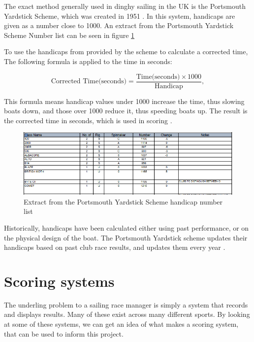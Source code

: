 \documentclass{l4proj}
\begin{document}
The exact method generally used in dinghy sailing in the UK is the Portsmouth Yardstick Scheme, which was created in 1951 \citep{hanicaps}. In this system, handicaps are given as a number close to 1000. An extract from the Portsmouth Yardstick Scheme Number list \citep{RYApy} can be seen in figure \ref{fig:Hanicaps}

To use the handicaps from provided by the scheme to calculate a corrected time, The following formula is applied to the time in seconds:

\begin{equation}
    \text{Corrected Time(seconds)} = \frac{\text{Time(seconds)} \times 1000}{\text{Handicap}},
    \label{eq:1}
\end{equation}  

This formula means handicap values under 1000 increase the time, thus slowing boats down, and those over 1000 reduce it, thus speeding boats up. The result is the corrected time in seconds, which is used in scoring \citep{RYAscore}.

\begin{figure}[H]
    \centering
    \includegraphics[width=1\linewidth]{images/Handicaps.png} 

    \caption{Extract from the Portsmouth Yardstick Scheme handicap number list \citep{RYApy}
    }

    \label{fig:Hanicaps} 
\end{figure}

Historically, handicaps have been calculated either using past performance, or on the physical design of the boat. The Portsmouth Yardstick scheme updates their handicaps based on past club race results, and updates them every year \citep{hanicaps}.

\section{Scoring systems}
The underling problem to a sailing race manager is simply a system that records and displays results. Many of these exist across many different sports. By looking at some of these systems, we can get an idea of what makes a scoring system, that can be used to inform this project.
\end{document}
